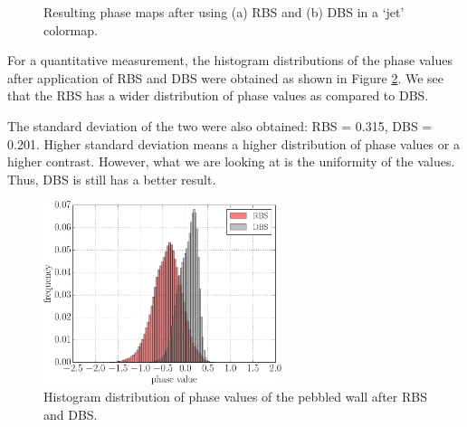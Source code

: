 \captionsetup[figure]{width=5in}
\begin{figure}[h!t]
	\centering
	\caption[Phase maps after RBS and DBS (jet colormap)]{Resulting phase maps after using (a) RBS and (b) DBS in a `jet' colormap.}
	\label{fig:stoneBSjet}
\end{figure}

For a quantitative measurement, the histogram distributions of the phase values after application of RBS and DBS were obtained as shown in Figure \ref{fig:stonehist}. We see that the RBS has a wider distribution of phase values as compared to DBS. 

The standard deviation of the two were also obtained: RBS = 0.315, DBS = 0.201. Higher standard deviation means a higher distribution of phase values or a higher contrast. However, what we are looking at is the uniformity of the values. Thus, DBS is still has a better result.

\captionsetup[figure]{width=5in}
\begin{figure}[h!]
	\centering
	\includegraphics[width=0.62\textwidth]{figures/stonehist.pdf}
	\caption[Histogram of phase values]{Histogram distribution of phase values of the pebbled wall after RBS and DBS.}
	\label{fig:stonehist}
\end{figure}

